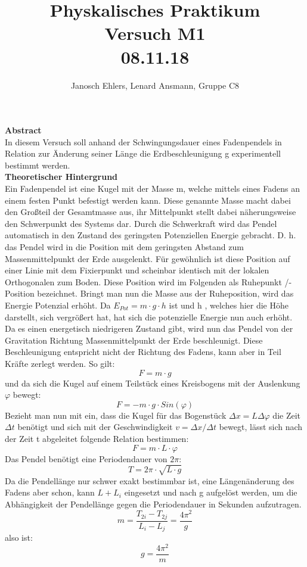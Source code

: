 \documentclass[11pt, a4paper]{article}
\begin{document}
\title{Physkalisches Praktikum\\Versuch M1\\08.11.18}
\author{Janosch Ehlers, Lenard Ansmann, Gruppe C8}
\maketitle

\textbf{Abstract}\\In diesem Versuch soll anhand der Schwingungsdauer eines Fadenpendels in Relation zur Änderung seiner Länge die Erdbeschleunigung g experimentell bestimmt werden.
\\

\textbf{Theoretischer Hintergrund}\\Ein Fadenpendel ist eine Kugel mit der Masse m, welche mittels eines Fadens an einem festen Punkt befestigt werden kann. Diese genannte Masse macht dabei den Großteil der Gesamtmasse aus, ihr Mittelpunkt stellt dabei näherungsweise den Schwerpunkt des Systems dar. Durch die Schwerkraft wird das Pendel automatisch in den Zustand des geringsten Potenziellen Energie gebracht. D. h. das Pendel wird in die Position mit dem geringsten Abstand zum Massenmittelpunkt der Erde ausgelenkt. Für gewöhnlich ist diese Position auf einer Linie mit dem Fixierpunkt und scheinbar identisch mit der lokalen Orthogonalen zum Boden. Diese Position wird im Folgenden als Ruhepunkt /-Position bezeichnet. Bringt man nun die Masse aus der Ruheposition, wird das Energie Potenzial erhöht. Da $E_{Pot} = m\cdot g\cdot h$ ist und h , welches hier die Höhe darstellt, sich vergrößert hat, hat sich die potenzielle Energie nun auch erhöht. Da es einen energetisch niedrigeren Zustand gibt, wird nun das Pendel von der Gravitation Richtung Massenmittelpunkt der Erde beschleunigt. Diese Beschleunigung entspricht nicht der Richtung des Fadens, kann aber in Teil Kräfte zerlegt werden. So gilt: $$F = m\cdot g$$ und da sich die Kugel auf einem Teilstück eines Kreisbogens mit der Auslenkung $\varphi$ bewegt: $$F=-m\cdot g\cdot Sin(\varphi)$$ Bezieht man nun mit ein, dass die Kugel für das Bogenstück $\Delta x = L \Delta \varphi$ die Zeit $\Delta t$ benötigt und  sich mit der Geschwindigkeit $v = \Delta x/ \Delta t$ bewegt, lässt sich nach der Zeit t abgeleitet folgende Relation bestimmen: $$ F= m\cdot L\cdot \varphi $$ Das Pendel benötigt eine Periodendauer von $2\pi$: $$ T=2\pi\cdot\sqrt{L\cdot g}$$ Da die Pendellänge nur schwer exakt bestimmbar ist, eine Längenänderung des Fadens aber schon, kann $L+L_i$ eingesetzt und nach g aufgelöst werden, um die Abhängigkeit der Pendellänge gegen die Periodendauer in Sekunden aufzutragen.$$m=\frac{T_{2i}-T_{2j}}{L_i-L_j}=\frac{4\pi^2}{g}$$ also ist: $$g=\frac{4\pi^2}{m}$$ 
\end{document}
